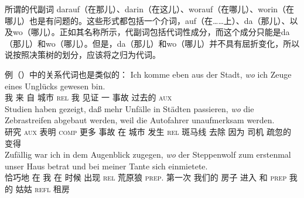 所谓的代副词 darauf（在那儿）、darin（在这儿）、worauf（在哪儿）、worin（在哪儿）也是有问题的。这些形式都包括一个介词，\egc auf（在……上）、da（那儿）、以及wo（哪儿）。正如其名称所示，代副词包括代词性成分，而这个成分只能是da（那儿）和wo（哪儿）。但是，da（那儿）和wo（哪儿）并不具有屈折变化，所以说按照决策树的划分，应该将之归为代词。

例（）中的关系代词也是类似的：
\eal
\ex 
\gll Ich komme eben        aus der          Stadt, \emph{wo}    ich Zeuge eines Unglücks gewesen bin.\footnotemark\\
     我  来     \particle{} 自   城市   \textsc{rel} 我  见证  一 事故 过去的 \textsc{aux} \\
\label{bsp-wo-ich-zeuge}
\ex 
\gll Studien haben    gezeigt, daß           mehr Unfälle in       Städten passieren, \emph{wo}    die   Zebrastreifen abgebaut werden, weil die Autofahrer unaufmerksam werden.\footnotemark\\
     研究 \textsc{aux} 表明     \textsc{comp} 更多 事故 在 城市    发生        \textsc{rel}  斑马线  去除 \passiveprs{} 因为  司机 疏忽的 变得\\
\ex 
\gll Zufällig war ich in dem Augenblick zugegen, \emph{wo} der Steppenwolf zum erstenmal unser Haus betrat und bei meiner Tante sich einmietete.\footnotemark\\
     恰巧地 在 我 在  时候 出现 \textsc{rel}  荒原狼 \textsc{prep}. 第一次 我们的 房子 进入 和 \textsc{prep} 我的 姑姑 \textsc{refl} 租房\\


